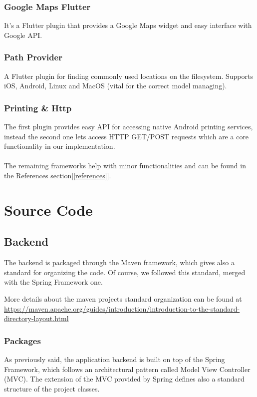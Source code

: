 \documentclass[table, 12pt]{article}
\begin{document}
\subsubsection{Google Maps Flutter}
It's a Flutter plugin that provides a Google Maps widget and easy interface with Google API.\\
\subsubsection{Path Provider}
A Flutter plugin for finding commonly used locations on the filesystem. Supports iOS, Android, Linux and MacOS (vital for the correct model managing).
\subsubsection{Printing \& Http}
The first plugin provides easy API for accessing native Android printing services, instead the second one lets access HTTP GET/POST requests which are a core functionality in our implementation.\\\\

The remaining frameworks help with minor functionalities and can be found in the References section[\ref{references}].\newpage
\section{Source Code}
\subsection{Backend}
The backend is packaged through the Maven framework, which gives also a standard for organizing the code. Of course, we followed this standard, merged with the Spring Framework one.

More details about the maven projects standard organization can be found at \href{https://maven.apache.org/guides/introduction/introduction-to-the-standard-directory-layout.html}{https://maven.apache.org/guides/introduction/introduction-to-the-standard-directory-layout.html}
\subsubsection{Packages}
As previously said, the application backend is built on top of the Spring Framework, which follows an architectural pattern called Model View Controller (MVC). The extension of the MVC provided by Spring defines also a standard structure of the project classes.
\end{document}
